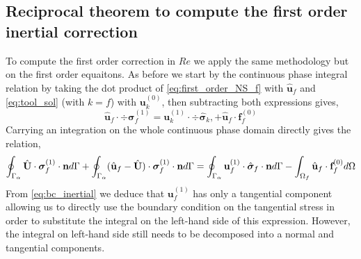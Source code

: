 \subsection{Reciprocal theorem to compute the first order inertial correction}

To compute the first order correction in $Re$ we apply the same methodology but on the first order equaitons. 
As before we start by the continuous phase integral relation by taking the dot product of \ref{eq:first_order_NS_f} with $\hat{\textbf{u}}_f$ and \ref{eq:tool_sol} (with $k = f$) with $\textbf{u}_k^{(0)}$, then subtracting both expressions gives, 
\begin{equation*}
    \hat{\textbf{u}}_f\cdot \div\bm\sigma_f^{(1)}
    =
    \textbf{u}_k^{(1)} \cdot \div \hat{\bm\sigma}_k, 
    + \hat{\textbf{u}}_f\cdot  \textbf{f}^{(0)}_f
\end{equation*}
Carrying an integration on the whole continuous phase domain directly gives the relation, 
\begin{equation*}
    \oint_{\Gamma_{\alpha}} \hat{\textbf{U}}\cdot  \bm\sigma_f^{(1)} \cdot \textbf{n} d\Gamma
    + \oint_{\Gamma_{\alpha}} (\hat{\textbf{u}}_f - \hat{\textbf{U}})\cdot  \bm\sigma_f^{(1)} \cdot \textbf{n} d\Gamma
    = 
    \oint_{\Gamma_{\alpha}} \textbf{u}_f^{(1)}\cdot  \hat{\bm\sigma}_f \cdot \textbf{n} d\Gamma
    - \int_{\Omega_f} \hat{\textbf{u}}_f\cdot  \textbf{f}^{(0)}_f d\Omega
\end{equation*}
From \ref{eq:bc_inertial} we deduce that $\textbf{u}_f^{(1)}$ has only a tangential component allowing us to directly use the boundary condition on the tangential stress in order to substitute the integral on the left-hand side of this expression. 
However, the integral on left-hand side still needs to be decomposed into a normal and tangential components. 

